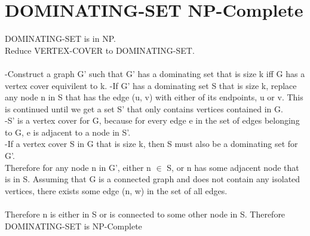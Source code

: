 \documentclass[10pt,a4paper]{article}
\begin{document}
\section{DOMINATING-SET NP-Complete}
DOMINATING-SET is in NP.\\
Reduce VERTEX-COVER to DOMINATING-SET.\\
\\
-Construct a graph G' such that G' has a dominating set that is size k iff G has a
vertex cover equivilent to k.
-If G' has a dominating set S that is size k, replace any node n in S that has the edge
(u, v) with either of its endpoints, u or v. This is continued until we get a set S' that only contains vertices contained in G.\\
-S' is a vertex cover for G, because for every edge e in the set of edges belonging
to G, e is adjacent to a node in S'.\\
-If a vertex cover S in G that is size k, then S must also be a dominating set for G'.\\
Therefore for any node n in G', either n $\in$ S, or n has some adjacent node that is in S.
Assuming that G is a connected graph and does not contain any isolated vertices, there exists
some edge (n, w) in the set of all edges. \\
\\
Therefore n is either in S or is connected to some other node in S.
Therefore DOMINATING-SET is NP-Complete
\end{document}
